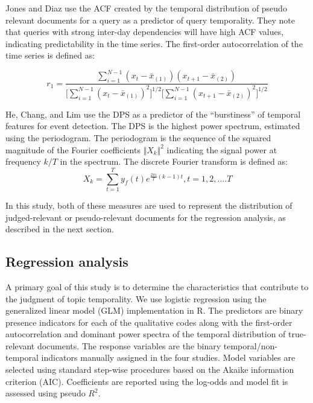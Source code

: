 \documentclass[runningheads,a4paper]{llncs}
\begin{document}
Jones and Diaz \cite{Jones2007} use the ACF created by the temporal distribution of pseudo relevant documents for a query as a predictor of query temporality. They note that queries with strong inter-day dependencies will have high ACF values, indicating predictability in the time series. The first-order autocorrelation of the time series is defined as:

\begin{equation}
r_1 = \dfrac{\sum_{i=1}^{N-1} (x_t - \bar{x}_{(1)})(x_{t+1} - \bar{x}_{(2)})}{ \big [ \sum_{i=1}^{N-1}  (x_t - \bar{x}_{(1)})^2 \big ] ^{1/2} \big [\sum_{i=1}^{N-1} (x_{t+1} - \bar{x}_{(2)})^2 \big ]^{1/2}}
\end{equation}

He, Chang, and Lim \cite{He2007} use the DPS as a predictor of the ``burstiness'' of temporal features for event detection. The DPS is the highest power spectrum, estimated using the periodogram. The periodogram is the sequence of the squared magnitude of the Fourier coefficients $\Vert X_k \Vert^2$ indicating the signal power at frequency $k/T$ in the spectrum.  The discrete Fourier transform is defined as: 
\begin{equation}
X_k = \sum_{t=1}^T y_f(t)e^{\frac{2\pi i}{T}(k - 1)t}, t=1,2,....T
\end{equation}

In this study, both of these measures are used to represent the distribution of judged-relevant or pseudo-relevant documents for the regression analysis, as described in the next section.

\subsection{Regression analysis}

A primary goal of this study is to determine the characteristics that contribute to the judgment of topic temporality. We use logistic regression using the generalized linear model (GLM) implementation in R. The predictors are binary presence indicators for each of the qualitative codes along with the first-order autocorrelation and dominant power spectra of the temporal distribution of true-relevant documents.  The response variables are the binary temporal/non-temporal indicators manually assigned in the four studies.  Model variables are selected using standard step-wise procedures based on the Akaike information criterion (AIC). Coefficients are reported using the log-odds and model fit is assessed using pseudo $R^2$.
\end{document}
